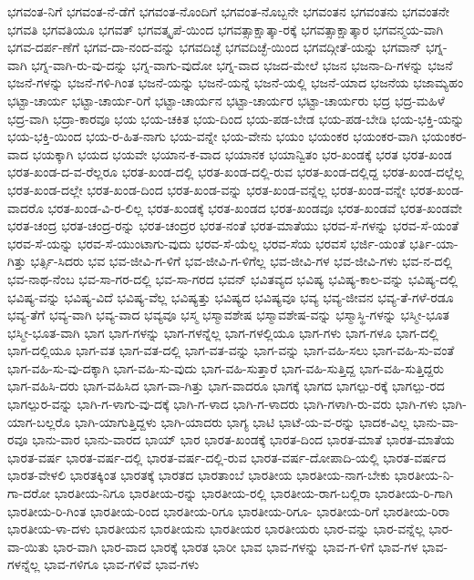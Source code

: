 {ಭಗವಂತ-ನಿಗೆ
ಭಗವಂತ-ನೆ-ಡೆಗೆ
ಭಗವಂತ-ನೊಂದಿಗೆ
ಭಗವಂತ-ನೊಬ್ಬನೇ
ಭಗವಂತನ
ಭಗವಂತನು
ಭಗವಂತನೇ
ಭಗವತಿ
ಭಗವತಿಯೂ
ಭಗವತ್
ಭಗವತ್ಕೃಪೆ-ಯಿಂದ
ಭಗವತ್ಸಾಕ್ಷಾತ್ಕಾ-ರಕ್ಕೆ
ಭಗವತ್ಸಾಕ್ಷಾತ್ಕಾರ
ಭಗವನ್ಮಯ-ವಾಗಿ
ಭಗವ-ದರ್ಪ-ಣೆಗೆ
ಭಗವ-ದಾ-ನಂದ-ವನ್ನು
ಭಗವದಿಚ್ಛೆ
ಭಗವದಿಚ್ಛೆ-ಯಿಂದ
ಭಗವದ್ಗೀತೆ-ಯನ್ನು
ಭಗವಾನ್
ಭಗ್ನ-ವಾಗಿ
ಭಗ್ನ-ವಾಗಿ-ರು-ವು-ದನ್ನು
ಭಗ್ನ-ವಾಗು-ವುದೋ
ಭಗ್ನ-ವಾದ
ಭಜದ-ಮೇಲೆ
ಭಜನ
ಭಜನಾ-ದಿ-ಗಳನ್ನು
ಭಜನೆ
ಭಜನೆ-ಗಳನ್ನು
ಭಜನೆ-ಗಳಿ-ಗಿಂತ
ಭಜನೆ-ಯನ್ನು
ಭಜನೆ-ಯನ್ನೆ
ಭಜನೆ-ಯಲ್ಲಿ
ಭಜನೆ-ಯಾದ
ಭಜನೆಯ
ಭಜಾಮ್ಯಹಂ
ಭಟ್ಟಾ-ಚಾರ್ಯ
ಭಟ್ಟಾ-ಚಾರ್ಯ-ರಿಗೆ
ಭಟ್ಟಾ-ಚಾರ್ಯನ
ಭಟ್ಟಾ-ಚಾರ್ಯರ
ಭಟ್ಟಾ-ಚಾರ್ಯರು
ಭದ್ರ
ಭದ್ರ-ಮಹಿಳೆ
ಭದ್ರ-ವಾಗಿ
ಭದ್ರಾ-ಕಾರವೂ
ಭಯ
ಭಯ-ಚಕಿತ
ಭಯ-ದಿಂದ
ಭಯ-ಪಡ-ಬೇಡ
ಭಯ-ಪಡ-ಬೇಡಿ
ಭಯ-ಭಕ್ತಿ-ಯನ್ನು
ಭಯ-ಭಕ್ತಿ-ಯಿಂದ
ಭಯ-ರ-ಹಿತ-ನಾಗು
ಭಯ-ವನ್ನೇ
ಭಯ-ವೇನು
ಭಯಂ
ಭಯಂಕರ
ಭಯಂಕರ-ವಾಗಿ
ಭಯಂಕರ-ವಾದ
ಭಯಕ್ಕಾಗಿ
ಭಯದ
ಭಯವೇ
ಭಯಾನ-ಕ-ವಾದ
ಭಯಾನಕ
ಭಯಾನ್ವಿತಂ
ಭರ-ಖಂಡಕ್ಕೆ
ಭರತ
ಭರತ-ಖಂಡ
ಭರತ-ಖಂಡ-ದ-ವ-ರೆಲ್ಲರೂ
ಭರತ-ಖಂಡ-ದಲ್ಲಿ
ಭರತ-ಖಂಡ-ದಲ್ಲಿ-ರುವ
ಭರತ-ಖಂಡ-ದಲ್ಲಿದ್ದ
ಭರತ-ಖಂಡ-ದಲ್ಲೆಲ್ಲ
ಭರತ-ಖಂಡ-ದಲ್ಲೇ
ಭರತ-ಖಂಡ-ದಿಂದ
ಭರತ-ಖಂಡ-ವನ್ನು
ಭರತ-ಖಂಡ-ವನ್ನೆಲ್ಲ
ಭರತ-ಖಂಡ-ವನ್ನೇ
ಭರತ-ಖಂಡ-ವಾದರೊ
ಭರತ-ಖಂಡ-ವಿ-ರ-ಲಿಲ್ಲ
ಭರತ-ಖಂಡಕ್ಕೆ
ಭರತ-ಖಂಡದ
ಭರತ-ಖಂಡವೂ
ಭರತ-ಖಂಡವೆ
ಭರತ-ಖಂಡವೇ
ಭರತ-ಚಂದ್ರ
ಭರತ-ಚಂದ್ರ-ರನ್ನು
ಭರತ-ಚಂದ್ರರ
ಭರತ-ನಂತೆ
ಭರತ-ಮಾತೆಯು
ಭರವ-ಸೆ-ಗಳನ್ನು
ಭರವ-ಸೆ-ಯಂತೆ
ಭರವ-ಸೆ-ಯನ್ನು
ಭರವ-ಸೆ-ಯುಂಟಾಗು-ವುದು
ಭರವ-ಸೆ-ಯೆಲ್ಲ
ಭರವ-ಸೆಯ
ಭರವಸೆ
ಭರ್ಜಿ-ಯಂತೆ
ಭರ್ತಿ-ಯಾ-ಗಿತ್ತು
ಭರ್ತ್ಸಿ-ಸಿದರು
ಭವ
ಭವ-ಜೀವಿ-ಗ-ಳಿಗೆ
ಭವ-ಜೀವಿ-ಗ-ಳಿಗೆಲ್ಲ
ಭವ-ಜೀವಿ-ಗಳ
ಭವ-ಜೀವಿ-ಗಳು
ಭವ-ನ-ದಲ್ಲಿ
ಭವ-ನಾಥ-ನೆಂಬ
ಭವ-ಸಾ-ಗರ-ದಲ್ಲಿ
ಭವ-ಸಾ-ಗರದ
ಭವನ್
ಭವಿತವ್ಯದ
ಭವಿಷ್ಯ
ಭವಿಷ್ಯ-ಕಾಲ-ವನ್ನು
ಭವಿಷ್ಯ-ದಲ್ಲಿ
ಭವಿಷ್ಯ-ವನ್ನು
ಭವಿಷ್ಯ-ವಿದೆ
ಭವಿಷ್ಯ-ವೆಲ್ಲ
ಭವಿಷ್ಯತ್ತು
ಭವಿಷ್ಯದ
ಭವಿಷ್ಯವೂ
ಭವ್ಯ
ಭವ್ಯ-ಜೀವನ
ಭವ್ಯ-ತೆ-ಗಳೆ-ರಡೂ
ಭವ್ಯ-ತೆಗೆ
ಭವ್ಯ-ವಾಗಿ
ಭವ್ಯ-ವಾದ
ಭವ್ಯವೂ
ಭಸ್ಮ
ಭಸ್ಮಾವಶೇಷ
ಭಸ್ಮಾವಶೇಷ-ವನ್ನು
ಭಸ್ಮಾಸ್ಥಿ-ಗಳನ್ನು
ಭಸ್ಮೀ-ಭೂತ
ಭಸ್ಮೀ-ಭೂತ-ವಾಗಿ
ಭಾಗ
ಭಾಗ-ಗಳನ್ನು
ಭಾಗ-ಗಳನ್ನೆಲ್ಲ
ಭಾಗ-ಗಳಲ್ಲಿಯೂ
ಭಾಗ-ಗಳು
ಭಾಗ-ಗಳೂ
ಭಾಗ-ದಲ್ಲಿ
ಭಾಗ-ದಲ್ಲಿಯೂ
ಭಾಗ-ವತ
ಭಾಗ-ವತ-ದಲ್ಲಿ
ಭಾಗ-ವತ-ವನ್ನು
ಭಾಗ-ವನ್ನು
ಭಾಗ-ವಹಿ-ಸಲು
ಭಾಗ-ವಹಿ-ಸು-ವಂತೆ
ಭಾಗ-ವಹಿ-ಸು-ವು-ದಕ್ಕಾಗಿ
ಭಾಗ-ವಹಿ-ಸು-ವುದು
ಭಾಗ-ವಹಿ-ಸುತ್ತಾರೆ
ಭಾಗ-ವಹಿ-ಸುತ್ತಿದ್ದ
ಭಾಗ-ವಹಿ-ಸುತ್ತಿದ್ದರು
ಭಾಗ-ವಹಿಸಿ-ದರು
ಭಾಗ-ವಹಿಸಿದ
ಭಾಗ-ವಾ-ಗಿತ್ತು
ಭಾಗ-ವಾದರೂ
ಭಾಗಕ್ಕೆ
ಭಾಗದ
ಭಾಗಲ್ಪು-ರಕ್ಕೆ
ಭಾಗಲ್ಪು-ರದ
ಭಾಗಲ್ಪುರ-ವನ್ನು
ಭಾಗಿ-ಗ-ಳಾಗು-ವು-ದಕ್ಕೆ
ಭಾಗಿ-ಗ-ಳಾದ
ಭಾಗಿ-ಗ-ಳಾದರು
ಭಾಗಿ-ಗಳಾಗಿ-ರು-ವರು
ಭಾಗಿ-ಗಳು
ಭಾಗಿ-ಯಾಗ-ಬಲ್ಲರೊ
ಭಾಗಿ-ಯಾಗುತ್ತಿದ್ದಳು
ಭಾಗಿ-ಯಾದರು
ಭಾಗ್ಯ
ಭಾಟಿ
ಭಾಟೆ-ಯ-ವ-ರನ್ನು
ಭಾದಕ-ವಿಲ್ಲ
ಭಾನು-ವಾ-ರವೂ
ಭಾನು-ವಾರ
ಭಾನು-ವಾರದ
ಭಾಯ್
ಭಾರ
ಭಾರತ-ಖಂಡಕ್ಕೆ
ಭಾರತ-ದಿಂದ
ಭಾರತ-ಮಾತೆ
ಭಾರತ-ಮಾತೆಯ
ಭಾರತ-ವರ್ಷ
ಭಾರತ-ವರ್ಷ-ದಲ್ಲಿ
ಭಾರತ-ವರ್ಷ-ದಲ್ಲಿ-ರುವ
ಭಾರತ-ವರ್ಷ-ದೋಪಾದಿ-ಯಲ್ಲಿ
ಭಾರತ-ವರ್ಷದ
ಭಾರತ-ವೇಳಲಿ
ಭಾರತಕ್ಕಿಂತ
ಭಾರತಕ್ಕೆ
ಭಾರತದ
ಭಾರತಾಂಬೆ
ಭಾರತೀಯ
ಭಾರತೀಯ-ನಾಗ-ಬೇಕು
ಭಾರತೀಯ-ನಿ-ಗಾ-ದರೋ
ಭಾರತೀಯ-ನಿಗೂ
ಭಾರತೀಯ-ರನ್ನು
ಭಾರತೀಯ-ರಲ್ಲಿ
ಭಾರತೀಯ-ರಾಗ-ಬಲ್ಲಿರಾ
ಭಾರತೀಯ-ರಿ-ಗಾಗಿ
ಭಾರತೀಯ-ರಿ-ಗಿಂತ
ಭಾರತೀಯ-ರಿಂದ
ಭಾರತೀಯ-ರಿಗೂ
ಭಾರತೀಯ-ರಿಗೂ-
ಭಾರತೀಯ-ರಿಗೆ
ಭಾರತೀಯ-ರಿರಾ
ಭಾರತೀಯ-ಳಾ-ದಳು
ಭಾರತೀಯನ
ಭಾರತೀಯನು
ಭಾರತೀಯರ
ಭಾರತೀಯರು
ಭಾರ-ವನ್ನು
ಭಾರ-ವನ್ನೆಲ್ಲ
ಭಾರ-ವಾ-ಯಿತು
ಭಾರ-ವಾಗಿ
ಭಾರ-ವಾದ
ಭಾರಕ್ಕೆ
ಭಾರತ
ಭಾರೀ
ಭಾವ
ಭಾವ-ಗಳನ್ನು
ಭಾವ-ಗ-ಳಿಗೆ
ಭಾವ-ಗಳ
ಭಾವ-ಗಳನ್ನೆಲ್ಲ
ಭಾವ-ಗಳಿಗೂ
ಭಾವ-ಗಳಿವೆ
ಭಾವ-ಗಳು
}
